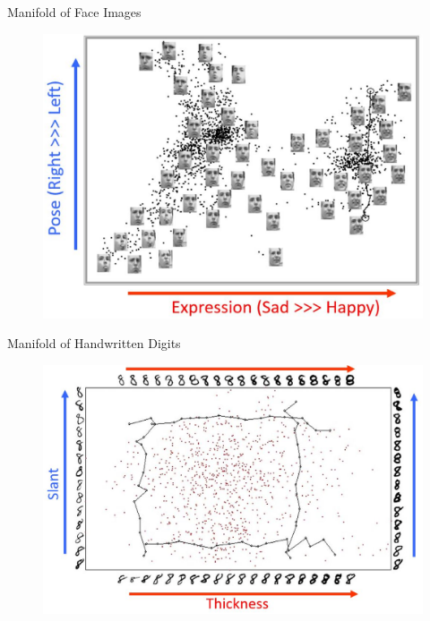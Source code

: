 \documentclass{beamer}
\begin{document}
\begin{darkframes}
	\begin{frame}{Manifold of Face Images}
	\begin{figure}
	\centering
	\includegraphics[scale=0.28]{./figs/fig4.eps}
	\end{figure}
	
	\end{frame}
	
	\begin{frame}{Manifold of Handwritten Digits}
	\begin{figure}
	\centering
	\includegraphics[scale=0.26]{./figs/fig5.eps}
	\end{figure}
	
	\end{frame}	
	

\end{darkframes}
\end{document}
